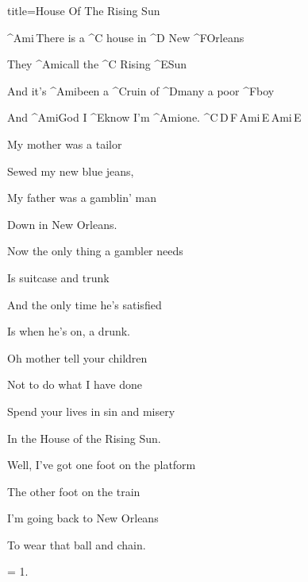\begin{song}{title=\predtitle\centering House Of The Rising Sun \\\large \vspace*{-0.3cm}}  %
\begin{centerjustified}
\nejvetsi

\sloka 
	^{Ami\,}There is a ^{C \z}house in ^{D \z}New ^{F}Orleans

	They ^{Ami}call the ^{C \z}Rising ^{E}Sun

	And it's ^{Ami}been a ^{C}ruin of ^{D}many a poor ^{F}boy

	And ^{Ami}God I ^{E}know I'm ^{Ami}one. ^{C\,D\,F\,Ami\,E\,Ami\,E}

\sloka
	My mother was a tailor
	
	Sewed my new blue jeans,
	
	My father was a gamblin' man
   	
   	Down in New Orleans.

\sloka
	Now the only thing a gambler needs

	Is suitcase and trunk

	And the only time he's satisfied

	Is when he's on, a drunk.

\sloka
	Oh mother tell your children

	Not to do what I have done

	Spend your lives in sin and misery

	In the House of the Rising Sun.

\sloka
	Well, I've got one foot on the platform

	The other foot on the train

	I'm going back to New Orleans

	To wear that ball and chain.

\sloka = 1.


\end{centerjustified}

\centering
{}

\setcounter{Slokočet}{0}
\end{song}
